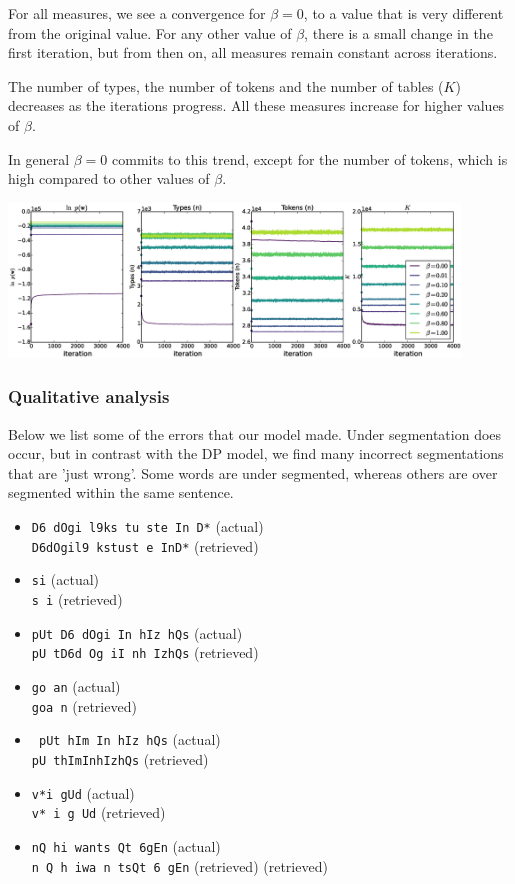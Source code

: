 For all measures, we see a convergence for $\beta = 0$, to a value that is very different from the original value. For any other value of $\beta$, there is a small change in the first iteration, but from then on, all measures remain constant across iterations.

The number of types, the number of tokens and the number of tables ($K$) decreases as the iterations progress. All these measures increase for higher values of $\beta$.

In general $\beta=0$ commits to this trend, except for the number of tokens, which is high compared to other values of $\beta$.

\begingroup
    \centering
    \includegraphics[width=0.9\textwidth]{images/PYP-iter_plots}
    \label{fig:PYPiter}
\endgroup

\subsubsection{Qualitative analysis}

Below we list some of the errors that our model made. Under segmentation does occur, but in contrast with the DP model, we find many incorrect segmentations that are 'just wrong'. Some words are under segmented, whereas others are over segmented within the same sentence.
\begin{itemize}
\item \texttt{D6 dOgi l9ks tu ste In D*} (actual)\\ \texttt{D6dOgil9 kstust e InD*} (retrieved)
\item \texttt{si} (actual)\\ \texttt{s i} (retrieved)
\item \texttt{pUt D6 dOgi In hIz hQs} (actual)\\ \texttt{pU tD6d Og iI nh IzhQs} (retrieved)
\item \texttt{go an} (actual)\\ \texttt{goa n} (retrieved)
\item \texttt{ pUt hIm In hIz hQs} (actual)\\ \texttt{pU thImInhIzhQs} (retrieved)
\item \texttt{v*i gUd} (actual)\\ \texttt{v* i g Ud} (retrieved)
\item \texttt{nQ hi wants Qt 6gEn} (actual)\\ \texttt{n Q h iwa n tsQt 6 gEn} (retrieved)
(retrieved)
\end{itemize}
